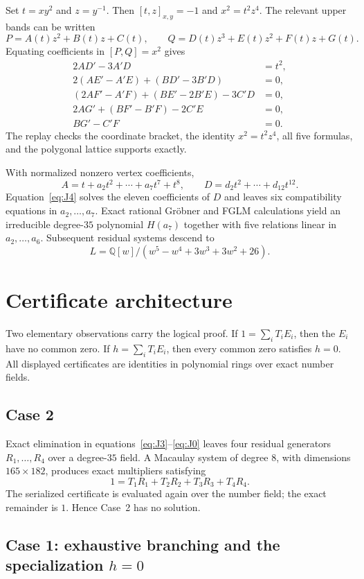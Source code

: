 \documentclass[11pt,a4paper]{article}
\theoremstyle{remark}
\newcommand{\Q}{\mathbb{Q}}
\begin{document}
Set $t=xy^2$ and $z=y^{-1}$. Then $[t,z]_{x,y}=-1$ and $x^2=t^2z^4$. The relevant upper bands can be written
\[
P=A(t)z^2+B(t)z+C(t),\qquad
Q=D(t)z^3+E(t)z^2+F(t)z+G(t).
\]
Equating coefficients in $[P,Q]=x^2$ gives
\begin{align*}
2AD'-3A'D&=t^2, \tag{J4}\label{eq:J4}\\
2(AE'-A'E)+(BD'-3B'D)&=0, \tag{J3}\label{eq:J3}\\
(2AF'-A'F)+(BE'-2B'E)-3C'D&=0, \tag{J2}\label{eq:J2}\\
2AG'+(BF'-B'F)-2C'E&=0, \tag{J1}\label{eq:J1}\\
BG'-C'F&=0. \tag{J0}\label{eq:J0}
\end{align*}
The replay checks the coordinate bracket, the identity $x^2=t^2z^4$, all five formulas, and the polygonal lattice supports exactly.

With normalized nonzero vertex coefficients,
\[
A=t+a_2t^2+\cdots+a_7t^7+t^8,
\qquad D=d_2t^2+\cdots+d_{12}t^{12}.
\]
Equation~\eqref{eq:J4} solves the eleven coefficients of $D$ and leaves six compatibility equations in $a_2,\ldots,a_7$. Exact rational Gr\"obner and FGLM calculations yield an irreducible degree-$35$ polynomial $H(a_7)$ together with five relations linear in $a_2,\ldots,a_6$. Subsequent residual systems descend to
\[
L=\Q[w]/(w^5-w^4+3w^3+3w^2+26).
\]

\section{Certificate architecture}

Two elementary observations carry the logical proof. If $1=\sum_i T_iE_i$, then the $E_i$ have no common zero. If $h=\sum_iT_iE_i$, then every common zero satisfies $h=0$. All displayed certificates are identities in polynomial rings over exact number fields.

\subsection{Case 2}

Exact elimination in equations~\eqref{eq:J3}--\eqref{eq:J0} leaves four residual generators $R_1,\ldots,R_4$ over a degree-$35$ field. A Macaulay system of degree $8$, with dimensions $165\times182$, produces exact multipliers satisfying
\[
1=T_1R_1+T_2R_2+T_3R_3+T_4R_4.
\]
The serialized certificate is evaluated again over the number field; the exact remainder is $1$. Hence Case~2 has no solution.

\subsection{Case 1: exhaustive branching and the specialization \texorpdfstring{$h=0$}{h=0}}
\end{document}

